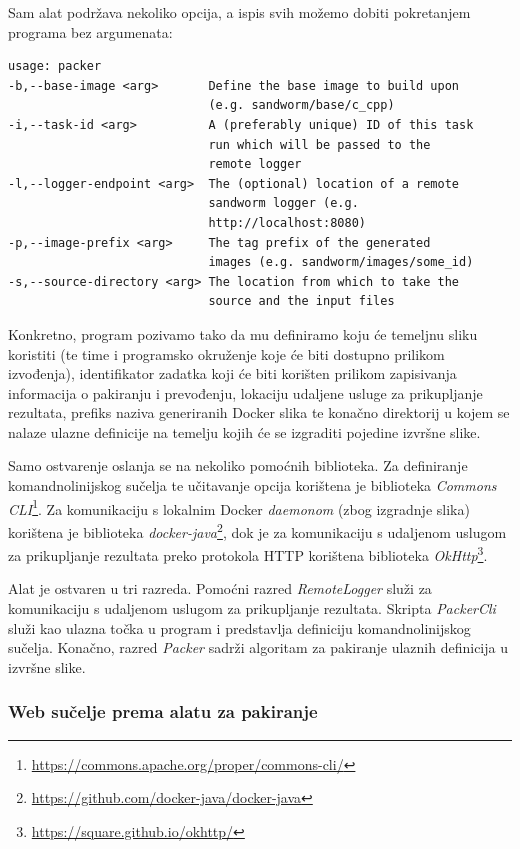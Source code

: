 \documentclass[times, utf8, zavrsni]{fer}
\begin{document}
{Sam alat podržava nekoliko opcija, a ispis svih možemo dobiti pokretanjem programa bez argumenata:

\begin{lstlisting}
usage: packer
-b,--base-image <arg>       Define the base image to build upon
                            (e.g. sandworm/base/c_cpp)
-i,--task-id <arg>          A (preferably unique) ID of this task
                            run which will be passed to the
                            remote logger
-l,--logger-endpoint <arg>  The (optional) location of a remote
                            sandworm logger (e.g.
                            http://localhost:8080)
-p,--image-prefix <arg>     The tag prefix of the generated
                            images (e.g. sandworm/images/some_id)
-s,--source-directory <arg> The location from which to take the
                            source and the input files
\end{lstlisting}

Konkretno, program pozivamo tako da mu definiramo koju će temeljnu sliku koristiti (te time i programsko okruženje koje će biti dostupno prilikom izvođenja), identifikator zadatka koji će biti korišten prilikom zapisivanja informacija o pakiranju i prevođenju, lokaciju udaljene usluge za prikupljanje rezultata, prefiks naziva generiranih Docker slika te konačno direktorij u kojem se nalaze ulazne definicije na temelju kojih će se izgraditi pojedine izvršne slike. 

Samo ostvarenje oslanja se na nekoliko pomoćnih biblioteka. Za definiranje komandnolinijskog sučelja te učitavanje opcija korištena je biblioteka {\textit{Commons CLI}}{\footnote{\url{https://commons.apache.org/proper/commons-cli/}}}. Za komunikaciju s lokalnim Docker {\textit{daemonom}} (zbog izgradnje slika) korištena je biblioteka {\textit{docker-java}}{\footnote{\url{https://github.com/docker-java/docker-java}}}, dok je za komunikaciju s udaljenom uslugom za prikupljanje rezultata preko protokola HTTP korištena biblioteka {\textit{OkHttp}}{\footnote{\url{https://square.github.io/okhttp/}}}.

Alat je ostvaren u tri razreda. Pomoćni razred {\textit{RemoteLogger}} služi za komunikaciju s udaljenom uslugom za prikupljanje rezultata. Skripta {\textit{PackerCli}} služi kao ulazna točka u program i predstavlja definiciju komandnolinijskog sučelja. Konačno, razred {\textit{Packer}} sadrži algoritam za pakiranje ulaznih definicija u izvršne slike.

\subsubsection{Web sučelje prema alatu za pakiranje}

}
\end{document}
